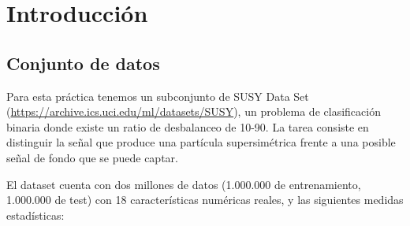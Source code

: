 \section{Introducción}

\subsection{Conjunto de datos}


Para esta práctica tenemos un subconjunto de SUSY Data Set (\url{https://archive.ics.uci.edu/ml/datasets/SUSY}), un problema de clasificación binaria donde existe un ratio de desbalanceo de 10-90. La tarea consiste en distinguir la señal que produce una partícula supersimétrica frente a una posible señal de fondo que se puede captar.

\vspace{\baselineskip}

El dataset cuenta con dos millones de datos (1.000.000 de entrenamiento, 1.000.000 de test) con 18 características numéricas reales, y las siguientes medidas estadísticas:

